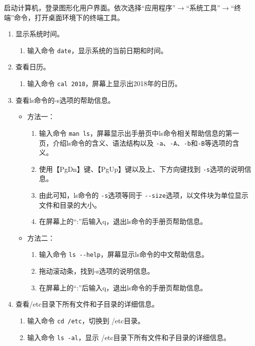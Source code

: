 启动计算机，登录图形化用户界面。依次选择“应用程序”$\rightarrow$“系统工具”$\rightarrow$“终端”命令，打开桌面环境下的终端工具。
\begin{enumerate}
  \item 显示系统时间。
    \begin{enumerate}
      \item 输入命令 \verb|date|，显示系统的当前日期和时间。
    \end{enumerate}
  \item 查看日历。
    \begin{enumerate}
      \item 输入命令 \verb|cal 2018|，屏幕上显示出2018年的日历。
    \end{enumerate}
  \item 查看ls命令的-s选项的帮助信息。
    \begin{itemize}
      \item 方法一：
	\begin{enumerate}
	  \item 输入命令 \verb|man ls|，屏幕显示出手册页中ls命令相关帮助信息的第一页，介绍ls命令的含义、语法结构以及 \verb|-a|、\verb|-A|、\verb|-b|和\verb|-B|等选项的含义。
	  \item 使用【PgDn】键、【PgUp】键以及上、下方向键找到 \verb|-s|选项的说明信息。
	  \item 由此可知，ls命令的 \verb|-s|选项等同于 \verb|--size|选项，以文件块为单位显示文件和目录的大小。
	  \item 在屏幕上的“:”后输入q，退出ls命令的手册页帮助信息。
	\end{enumerate}
      \item 方法二：
	\begin{enumerate}
	  \item 输入命令 \verb|ls --help|，屏幕显示ls命令的中文帮助信息。
	  \item 拖动滚动条，找到-s选项的说明信息。
	  \item 在屏幕上的“:”后输入q，退出ls命令的手册页帮助信息。
	\end{enumerate}
    \end{itemize}
  \item 查看/etc目录下所有文件和子目录的详细信息。
    \begin{enumerate}
      \item 输入命令 \verb|cd /etc|，切换到 /etc目录。
      \item 输入命令 \verb|ls -al|，显示 /etc目录下所有文件和子目录的详细信息。
    \end{enumerate}
\end{enumerate}

